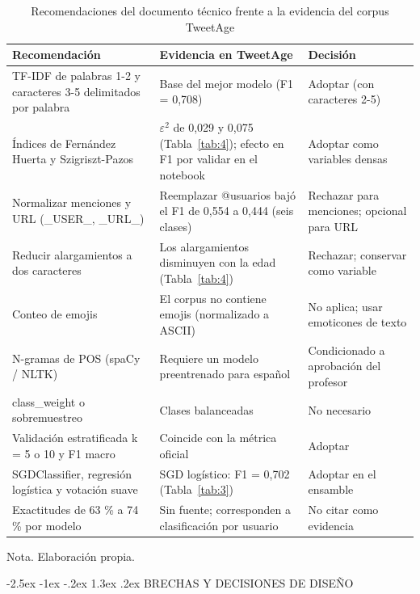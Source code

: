 \documentclass[10pt,twocolumn]{article}
\makeatletter
\renewcommand{\section}{\@startsection{section}{1}{\z@}%
  {-2.5ex \@plus -1ex \@minus -.2ex}%
  {1.3ex \@plus .2ex}%
  {\normalfont\large\bfseries\centering}}
\makeatother
\begin{document}
\begin{table}[!t]
\centering\scriptsize
\caption{Recomendaciones del documento técnico frente a la evidencia del corpus TweetAge}\label{tab:5}
\renewcommand{\arraystretch}{1.15}
\begin{tabular}{p{}p{}p{}}
\hline
\raggedright\textbf{Recomendación} & \raggedright\textbf{Evidencia en TweetAge} & \raggedright\textbf{Decisión} \tabularnewline \hline
\raggedright TF-IDF de palabras 1-2 y caracteres 3-5 delimitados por palabra & \raggedright Base del mejor modelo (F1 = 0,708) & \raggedright Adoptar (con caracteres 2-5) \tabularnewline
\raggedright Índices de Fernández Huerta y Szigriszt-Pazos & \raggedright $\varepsilon^2$ de 0,029 y 0,075 (Tabla~\ref{tab:4}); efecto en F1 por validar en el notebook & \raggedright Adoptar como variables densas \tabularnewline
\raggedright Normalizar menciones y URL (\_USER\_, \_URL\_) & \raggedright Reemplazar @usuarios bajó el F1 de 0,554 a 0,444 (seis clases) & \raggedright Rechazar para menciones; opcional para URL \tabularnewline
\raggedright Reducir alargamientos a dos caracteres & \raggedright Los alargamientos disminuyen con la edad (Tabla~\ref{tab:4}) & \raggedright Rechazar; conservar como variable \tabularnewline
\raggedright Conteo de emojis & \raggedright El corpus no contiene emojis (normalizado a ASCII) & \raggedright No aplica; usar emoticones de texto \tabularnewline
\raggedright N-gramas de POS (spaCy / NLTK) & \raggedright Requiere un modelo preentrenado para español & \raggedright Condicionado a aprobación del profesor \tabularnewline
\raggedright class\_weight o sobremuestreo & \raggedright Clases balanceadas & \raggedright No necesario \tabularnewline
\raggedright Validación estratificada k = 5 o 10 y F1 macro & \raggedright Coincide con la métrica oficial & \raggedright Adoptar \tabularnewline
\raggedright SGDClassifier, regresión logística y votación suave & \raggedright SGD logístico: F1 = 0,702 (Tabla~\ref{tab:3}) & \raggedright Adoptar en el ensamble \tabularnewline
\raggedright Exactitudes de 63 \% a 74 \% por modelo & \raggedright Sin fuente; corresponden a clasificación por usuario & \raggedright No citar como evidencia \tabularnewline
\hline
\end{tabular}
\par\smallskip\raggedright\scriptsize Nota. Elaboración propia.
\end{table}


\section{BRECHAS Y DECISIONES DE DISEÑO}\label{sec:10}
\end{document}
